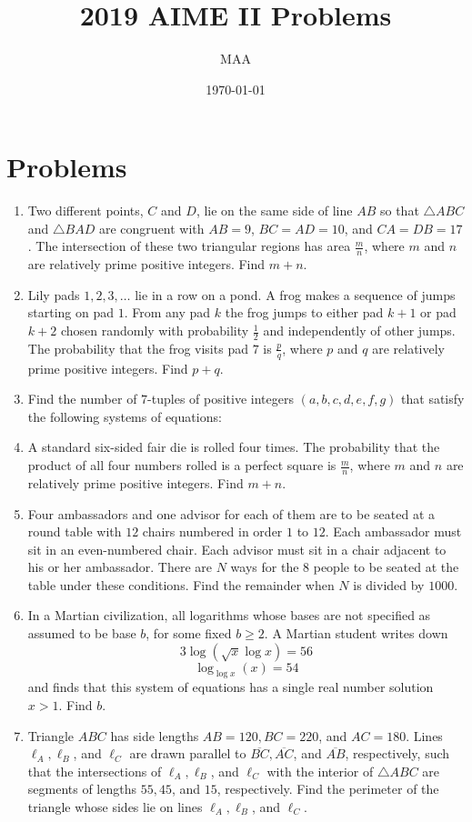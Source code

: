 \documentclass{article}%
\title{2019 AIME II Problems}%
\author{MAA}%
\date{\today}%
\begin{document}
%
\normalsize%
\maketitle%
\section{Problems}%
\label{sec:Problems}%
\begin{enumerate}%
\item%
Two different points, $C$ and $D$, lie on the same side of line $AB$ so that $\triangle ABC$ and $\triangle BAD$ are congruent with $AB = 9$, $BC=AD=10$, and $CA=DB=17$. The intersection of these two triangular regions has area $\frac mn$, where $m$ and $n$ are relatively prime positive integers. Find $m+n$.
%
\item%
Lily pads $1,2,3,\ldots$ lie in a row on a pond. A frog makes a sequence of jumps starting on pad $1$. From any pad $k$ the frog jumps to either pad $k+1$ or pad $k+2$ chosen randomly with probability $\frac{1}{2}$ and independently of other jumps. The probability that the frog visits pad $7$ is $\frac{p}{q}$, where $p$ and $q$ are relatively prime positive integers. Find $p+q$.
%
\item%
Find the number of $7$-tuples of positive integers $(a,b,c,d,e,f,g)$ that satisfy the following systems of equations:
%
\item%
A standard six-sided fair die is rolled four times. The probability that the product of all four numbers rolled is a perfect square is $\frac{m}{n}$, where $m$ and $n$ are relatively prime positive integers. Find $m+n$.
%
\item%
Four ambassadors and one advisor for each of them are to be seated at a round table with $12$ chairs numbered in order $1$ to $12$. Each ambassador must sit in an even-numbered chair. Each advisor must sit in a chair adjacent to his or her ambassador. There are $N$ ways for the $8$ people to be seated at the table under these conditions. Find the remainder when $N$ is divided by $1000$.
%
\item%
In a Martian civilization, all logarithms whose bases are not specified as assumed to be base $b$, for some fixed $b\ge2$. A Martian student writes down
\[3\log(\sqrt{x}\log x)=56\]
\[\log_{\log x}(x)=54\]
and finds that this system of equations has a single real number solution $x>1$. Find $b$.
%
\item%
Triangle $ABC$ has side lengths $AB=120,BC=220$, and $AC=180$. Lines $\ell_A,\ell_B$, and $\ell_C$ are drawn parallel to $\overline{BC},\overline{AC}$, and $\overline{AB}$, respectively, such that the intersections of $\ell_A,\ell_B$, and $\ell_C$ with the interior of $\triangle ABC$ are segments of lengths $55,45$, and $15$, respectively. Find the perimeter of the triangle whose sides lie on lines $\ell_A,\ell_B$, and $\ell_C$.

\end{enumerate}
\end{document}
